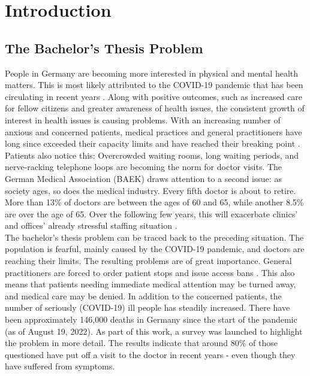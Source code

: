 
\chapter{Introduction}

\section{The Bachelor's Thesis Problem}
People in Germany are becoming more interested in physical and mental health matters. This is most likely attributed to the COVID-19 pandemic that has been circulating in recent years \cite{.bahn-bonn}. Along with positive outcomes, such as increased care for fellow citizens and greater awareness of health issues, the consistent growth of interest in health issues is causing problems. With an increasing number of anxious and concerned patients, medical practices and general practitioners have long since exceeded their capacity limits and have reached their breaking point \cite{.sok}. Patients also notice this: Overcrowded waiting rooms, long waiting periods, and nerve-racking telephone loops are becoming the norm for doctor visits. The German Medical Association (BAEK) draws attention to a second issue: as society ages, so does the medical industry. Every fifth doctor is about to retire. More than 13\% of doctors are between the ages of 60 and 65, while another 8.5\% are over the age of 65. Over the following few years, this will exacerbate clinics' and offices' already stressful staffing situation \cite{.blatt}. 
\newline \\
The bachelor's thesis problem can be traced back to the preceding situation. The population is fearful, mainly caused by the COVID-19 pandemic, and doctors are reaching their limits. The resulting problems are of great importance. General practitioners are forced to order patient stops and issue access bans \cite{.sok}. This also means that patients needing immediate medical attention may be turned away, and medical care may be denied. In addition to the concerned patients, the number of seriously (COVID-19) ill people has steadily increased. There have been approximately 146,000 deaths in Germany since the start of the pandemic (as of August 19, 2022)\cite{.rki}. As part of this work, a survey was launched to highlight the problem in more detail. The results indicate that around 80\% of those questioned have put off a visit to the doctor in recent years - even though they have suffered from symptoms.
